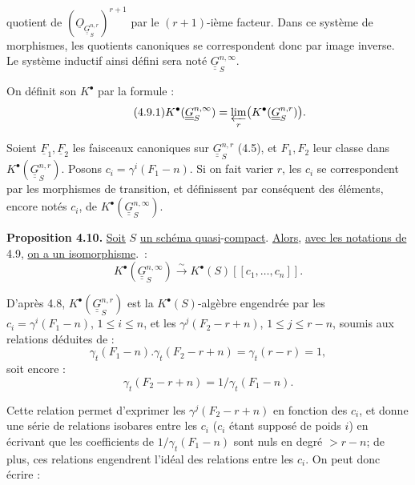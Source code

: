 
quotient de \((\underline{O}_{\underline{\underline{G}}_S^{n,r}})^{r+1}\) par le \((r+1)\)-ième facteur. Dans ce système de morphismes, les quotients canoniques se correspondent donc par image inverse. Le système inductif ainsi défini sera noté \(\underline{\underline{G}}_S^{n,\infty}\).

On définit son \(K^{\bullet}\) par la formule :
\begin{equation}\tag{4.9.1}
  K^{\bullet}(\underline{\underline{G}}_S^{n,\infty})
  = \varprojlim_r \bigl(K^{\bullet}(\underline{\underline{G}}_S^{n,r})\bigr) .
\end{equation}

Soient \(\underline{F}_1,\underline{F}_2\) les faisceaux canoniques sur \(\underline{\underline{G}}_S^{n,r}\) (4.5), et \(F_1,F_2\) leur classe dans \(K^{\bullet}(\underline{\underline{G}}_S^{n,r})\). Posons \(c_i=\gamma^i(F_1-n)\). Si on fait varier \(r\), les \(c_i\) se correspondent par les morphismes de transition, et définissent par conséquent des éléments, encore notés \(c_i\), de \(K^{\bullet}(\underline{\underline{G}}_S^{n,\infty})\).

\textbf{Proposition 4.10.} \uline{Soit} \(S\) \uline{un schéma quasi}-\uline{compact}. \uline{Alors}, \uline{avec les notations de} 4.9, \uline{on a un isomorphisme}.~:
\[
  K^{\bullet}(\underline{\underline{G}}_S^{n,\infty})\xrightarrow{\sim} K^{\bullet}(S)[[c_1,\ldots,c_n]] .
\]

D'après 4.8, \(K^{\bullet}(\underline{\underline{G}}_S^{n,r})\) est la \(K^{\bullet}(S)\)-algèbre engendrée par les \(c_i=\gamma^i(F_1-n)\), \(1\le i\le n\), et les \(\gamma^j(F_2-r+n)\), \(1\le j\le r-n\), soumis aux relations déduites de :
\[
  \gamma_t(F_1-n).\gamma_t(F_2-r+n)
  = \gamma_t(r-r)=1,
\]
soit encore :
\[
  \gamma_t(F_2-r+n)=1/\gamma_t(F_1-n).
\]

Cette relation permet d'exprimer les \(\gamma^j(F_2-r+n)\) en fonction des \(c_i\), et donne une série de relations isobares entre les \(c_i\) (\(c_i\) étant supposé de poids \(i\)) en écrivant que les coefficients de \(1/\gamma_t(F_1-n)\) sont nuls en degré \(>r-n\); de plus, ces relations engendrent l'idéal des relations entre les \(c_i\). On peut donc écrire :
